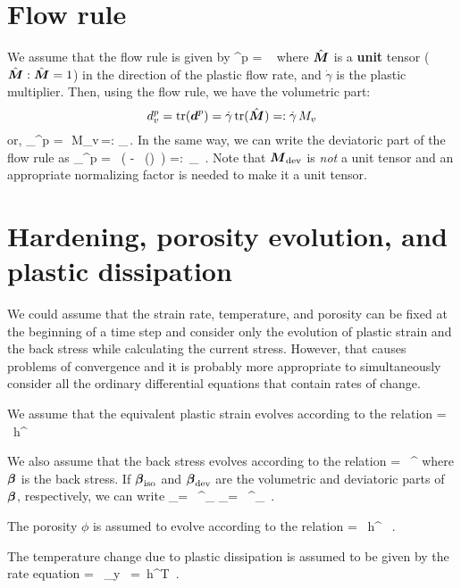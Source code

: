 \section{Flow rule}
We assume that the flow rule is given by
\Beq
  \BdT^p = \dot{\gamma}~\hat{\BM}
\Eeq
where $\hat{\boldsymbol{M}}$ is a \textbf{unit} tensor ($\hat{\boldsymbol{M}}:\hat{\boldsymbol{M}} = 1$) in the direction of the plastic flow
rate, and $\dot{\gamma}$ is the plastic multiplier.
Then, using the flow rule, we have the volumetric part:
\[
  d_v^p = \text{tr}(\boldsymbol{d}^p) = \dot{\gamma}\,\text{tr}(\hat{\boldsymbol{M}}) =: \dot{\gamma}\,M_v
\]
or,
\Beq
 \BdT_\Tvol^p = \Third\,\dot{\gamma}\,M_v\,\Bone =: \dot{\gamma} \BM_\Tiso\,.
\Eeq
In the same way, we can write the deviatoric part of the flow rule as
\Beq
  \BdT_\Tdis^p = \dot{\gamma}~\left(\hat{\BM} - \Third~\Tr(\hat{\BM})~\Bone\right)
          =: \dot{\gamma}\,\BM_\Tdev ~.
\Eeq
Note that $\boldsymbol{M}_{\text{dev}}$ is \textit{not} a unit tensor and an
appropriate normalizing factor is needed to make it a unit tensor.

\section{Hardening, porosity evolution, and plastic dissipation}
We could assume that the strain rate, temperature, and porosity can be fixed at the
beginning of a time step and consider only the evolution of plastic strain and
the back stress while calculating the current stress.  However, that causes
problems of convergence and it is probably more appropriate to simultaneously
consider all the ordinary differential equations that contain rates of change.

We assume that the equivalent plastic strain evolves according to the relation
\Beq
   = \dot{\gamma}~h^{\alpha}
\Eeq

We also assume that the back stress evolves according to the relation
\Beq
  \dot{\Bbeta} = \dot{\gamma}~\Bh^{\beta}
\Eeq
where $\boldsymbol{\beta}$ is the back stress.  If $\boldsymbol{\beta}_{\text{iso}}$ and $\boldsymbol{\beta}_{\text{dev}}$ are the 
volumetric and deviatoric parts of $\boldsymbol{\beta}$, respectively, we can write
\Beq
  \dot{\Bbeta}_\Tiso = \dot{\gamma}~\Bh^{\beta}_\Tiso  \qquad
  \dot{\Bbeta}_\Tdev = \dot{\gamma}~\Bh^{\beta}_\Tdev ~.
\Eeq

The porosity $\phi$ is assumed to evolve according to the relation
\Beq
  \dot{\phi} = \dot{\gamma}~h^{\phi} ~.
\Eeq

The temperature change due to plastic dissipation is assumed to be
given by the rate equation
\Beq
   = ~\sigma_y~ = \dot{\gamma}\,h^T \,.
\Eeq

